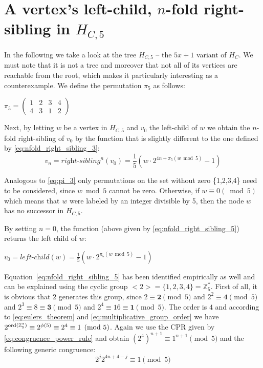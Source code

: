 \section{\texorpdfstring{A vertex's left-child, $n$-fold right-sibling in $H_{C,5}$}{A vertex's left-child, n-fold right-sibling in HC5}}
\label{sec:left_child_right_sibling_5}

In the following we take a look at the tree $H_{C,5}$ -- the $5x+1$ variant of $H_C$. We must note that it is not a tree and moreover that not all of its vertices are reachable from the root, which makes it particularly interesting as a counterexample. We define the permutation $\pi_5$ as follows:
\begin{center}
\label{eq:pi_5}
    $\pi_5=\left(\begin{array}{cccc}
    	1 & 2 & 3 & 4\\
    	4 & 3 & 1 & 2
    \end{array}\right)$	
\end{center}

Next, by letting $w$ be a vertex in $H_{C,5}$ and $v_0$ the left-child of $w$
we obtain the $n$-fold right-sibling of $v_0$ by the function that
is slightly different to the one defined by \ref{eq:nfold_right_sibling_3}:
\begin{equation}
\label{eq:nfold_right_sibling_5}
    v_n=\textit{right-sibling}^n(v_0)=\frac{1}{5}\left(w\cdot2^{4n+\pi_5(w\bmod 5)}-1\right)
\end{equation}

Analogous to \ref{eq:pi_3} only permutations on the set without zero
\{1,2,3,4\} need to be considered, since $w\bmod 5$ cannot be zero.
Otherwise, if $w\equiv 0 (\bmod 5)$ which means that $w$ were labeled
by an integer divisible by 5, then the node $w$ has no successor in $H_{C,5}$.

\noindent
By setting $n=0$, the function (above given by \ref{eq:nfold_right_sibling_5}) returns the left child of $w$:
\begin{center}
	$v_0=\textit{left-child}(w)=\frac{1}{5}\left(w\cdot2^{\pi_5(w\bmod 5)}-1\right)$
\end{center}

Equation~\ref{eq:nfold_right_sibling_5} has been identified empirically as well and can be explained using the cyclic group $<2>=\{1,2,3,4\}=\mathbb{Z}_5^\ast$. First of all, it is obvious that $2$ generates this group, since $2\equiv\boldsymbol{2}\pmod5$ and $2^2\equiv\boldsymbol{4}\pmod5$ and $2^3\equiv8\equiv\boldsymbol{3}\pmod5$ and $2^4\equiv16\equiv\boldsymbol{1}\pmod5$. The order is $4$ and according to \ref{eq:eulers_theorem} and \ref{eq:multiplicative_group_order} we have $2^{\operatorname{ord}(\mathbb{Z}_5^\ast)}\equiv2^{\phi(5)}\equiv2^4\equiv1\pmod5$. Again we use the CPR given by \ref{eq:congruence_power_rule} and obtain $(2^4)^{n+1}\equiv1^{n+1}\pmod5$ and the following generic congruence:
\begin{equation}
\label{eq:congruence_k5}
2^j2^{4n+4-j}\equiv1\pmod5
\end{equation}

